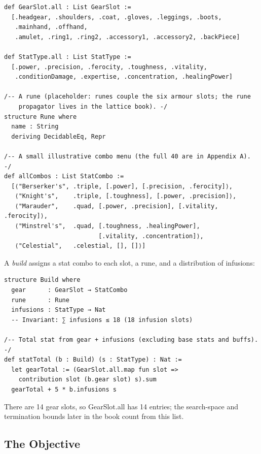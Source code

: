 \documentclass[11pt, a4paper, oneside]{book}
\newcommand{\li}[1]{{\ttfamily\small\color{deepblue}#1}}
\begin{document}
\begin{leanbox}[title={Lean 4 --- Enumerations and Runes}]
\begin{verbatim}
def GearSlot.all : List GearSlot :=
  [.headgear, .shoulders, .coat, .gloves, .leggings, .boots,
   .mainhand, .offhand,
   .amulet, .ring1, .ring2, .accessory1, .accessory2, .backPiece]

def StatType.all : List StatType :=
  [.power, .precision, .ferocity, .toughness, .vitality,
   .conditionDamage, .expertise, .concentration, .healingPower]

/-- A rune (placeholder: runes couple the six armour slots; the rune
    propagator lives in the lattice book). -/
structure Rune where
  name : String
  deriving DecidableEq, Repr

/-- A small illustrative combo menu (the full 40 are in Appendix A). -/
def allCombos : List StatCombo :=
  [⟨"Berserker's", .triple, [.power], [.precision, .ferocity]⟩,
   ⟨"Knight's",    .triple, [.toughness], [.power, .precision]⟩,
   ⟨"Marauder",    .quad, [.power, .precision], [.vitality, .ferocity]⟩,
   ⟨"Minstrel's",  .quad, [.toughness, .healingPower],
                          [.vitality, .concentration]⟩,
   ⟨"Celestial",   .celestial, [], []⟩]
\end{verbatim}
\end{leanbox}

A \emph{build} assigns a stat combo to each slot, a rune, and a distribution
of infusions:

\begin{leanbox}[title={Lean 4 --- Build and Stat Total}]
\begin{verbatim}
structure Build where
  gear      : GearSlot → StatCombo
  rune      : Rune
  infusions : StatType → Nat
  -- Invariant: ∑ infusions ≤ 18 (18 infusion slots)

/-- Total stat from gear + infusions (excluding base stats and buffs). -/
def statTotal (b : Build) (s : StatType) : Nat :=
  let gearTotal := (GearSlot.all.map fun slot =>
    contribution slot (b.gear slot) s).sum
  gearTotal + 5 * b.infusions s
\end{verbatim}
\end{leanbox}

There are 14 gear slots, so \li{GearSlot.all} has 14 entries; the search-space
and termination bounds later in the book count from this list.

\subsection{The Objective}
\end{document}
